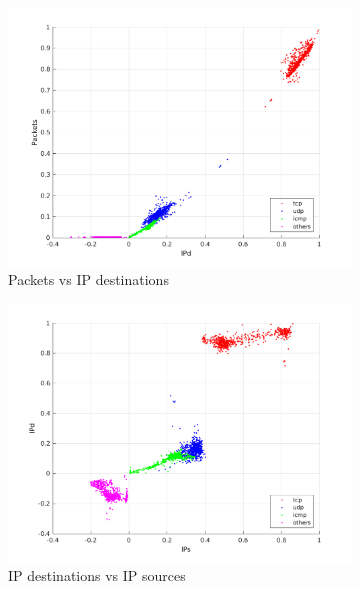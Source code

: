 \documentclass{article}
\begin{document}
\begin{figure}[h]
    \begin{subfigure}{.5\textwidth}
        \centering
        \includegraphics[width=\textwidth]{../exercise-3/plots/rep_17_optional_IPdPackets.png}
        \caption{Packets vs IP destinations}
    \end{subfigure}
    \begin{subfigure}{.5\textwidth}
        \centering
        \includegraphics[width=\textwidth]{../exercise-3/plots/rep_17_optional_IPsIPd.png}
        \caption{IP destinations vs IP sources}
    \end{subfigure}
    \begin{subfigure}{.5\textwidth}
        \centering

\end{subfigure}
\end{figure}
\end{document}
